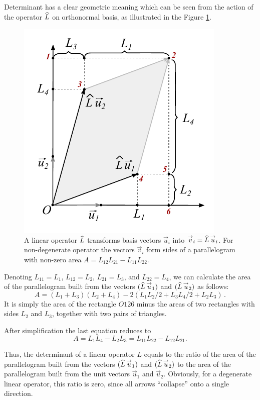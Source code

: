 Determinant has a clear geometric meaning which can be seen
from the action of the operator $\widehat{L}$ on orthonormal basis, as
illustrated in the Figure \ref{fig:operatorsDeterminant}.
\begin{figure}[htbp]
  \centering
  \includegraphics[scale=1.0]{operatorsDeterminant}
  \caption{A linear operator $\widehat{L}$ transforms basis vectors
    $\vec{u}_i$ into $\overset{\rightarrow}{v}_i=\widehat{L}\,\overset{\rightarrow}{u}_i$. For non-degenerate
  operator the vectors $\vec{v}_i$ form sides of a parallelogram with
  non-zero area $A=L_{12}L_{21}-L_{11}L_{22}$.}
  \label{fig:operatorsDeterminant}
\end{figure}
Denoting $L_{11} = L_{1}$, $L_{12} = L_2$, $L_{21} = L_3$, and
$L_{22} = L_4$, we can calculate the area of the parallelogram
built from the vectors $(\widehat{L}\,\overset{\rightarrow}{u}_1)$ and
$(\widehat{L}\,\overset{\rightarrow}{u}_2)$ as follows:
\[
A = (L_1 + L_3)(L_2 + L_4) - 2( L_1L_2/2 + L_3L_4/2 + L_2L_3)\,.
\]
It is simply the area of the rectangle $O126$ minus the areas of two
rectangles with sides $L_2$ and $L_3$, together with two pairs of
triangles.

After simplification the last equation reduces to
\[
A = L_1L_4-L_2L_3 = L_{11}L_{22} - L_{12}L_{21}.
\]

Thus, the determinant of a
linear operator $L$ equals to the ratio of the area of the parallelogram built
from the vectors $(\widehat{L}\,\overset{\rightarrow}{u}_1)$ and $(\widehat{L}\,\overset{\rightarrow}{u}_2)$ to the
 area of the parallelogram built from the unit vectors
$\vec{u}_1$ and $\vec{u}_2$. Obviously,
for a degenerate linear operator, this ratio is zero, since all arrows
``collapse'' onto a single direction.

